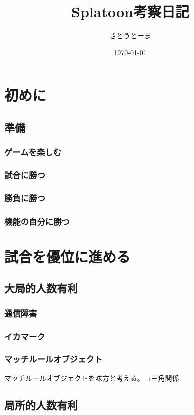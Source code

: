 \documentclass[a4paper,11pt]{jsbook}
\begin{document}
\title{Splatoon考察日記}
\author{さとうとーま}
\date{\today}
\maketitle
\tableofcontents

\part{初めに}
\chapter{準備}
\section{ゲームを楽しむ}
\section{試合に勝つ}
\section{勝負に勝つ}
\section{機能の自分に勝つ}


\part{試合を優位に進める}
\chapter{大局的人数有利}
\section{通信障害}
\section{イカマーク}
\section{マッチルールオブジェクト}
マッチルールオブジェクトを味方と考える。→三角関係

\chapter{局所的人数有利}
\end{document}
